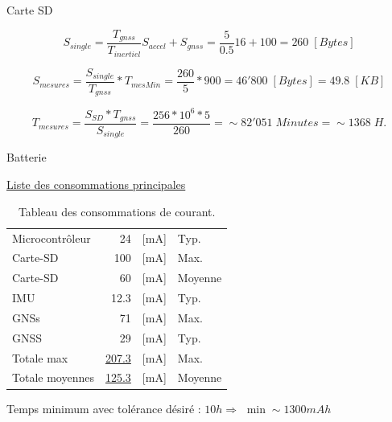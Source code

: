 \documentclass{beamer}
\begin{document}
\begin{frame}{Carte SD}
	\begin{center}
	\end{center}\vspace*{-3mm}
	
	\begin{equation*}
		S_{single} = \frac{T_{gnss}}{T_{inertiel}}S_{accel} + S_{gnss} = \frac{5}{0.5}16 + 100 = 260 \; [Bytes]
	\end{equation*}\vspace*{-10mm}
	
	\begin{equation*}
		S_{mesures} = \frac{S_{single}}{T_{gnss}} * T_{mesMin} = \frac{260}{5} * 900 = 46'800 \; [Bytes] = 49.8 \; [KB]
	\end{equation*}\vspace*{-10mm}
	
	\begin{equation*}
		T_{mesures} = \frac{S_{SD}*T_{gnss}}{S_{single}} = \frac{256*10^6*5}{260} = \sim82'051 \; Minutes = \sim1368 \; H.
	\end{equation*}
\end{frame}

\begin{frame}{Batterie}
	\begin{center}
		\underline{Liste des consommations principales} \\
		\begin{table}[h]
			\centering
			\begin{tabular}{lrll}
				Microcontrôleur & 24 & [mA] & Typ. \\
				Carte-SD & ~100 & [mA] & Max. \\
				Carte-SD & ~60 & [mA] & Moyenne \\
				IMU & 12.3 & [mA] & Typ. \\
				GNSs & 71 & [mA] & Max. \\
				GNSS & 29 & [mA] & Typ. \\
				\hline
				Totale max & \underline{207.3} & [mA] & Max. \\
				Totale moyennes & \underline{125.3} & [mA] & Moyenne \\
				\hline
			\end{tabular}
			\caption{Tableau des consommations de courant.}
			\label{tab:consommateur}
		\end{table}
	\end{center}
	Temps minimum avec tolérance désiré : $10h \Rightarrow$ $\min\sim1300mAh$
\end{frame}
\end{document}
